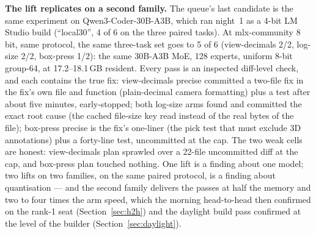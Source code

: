 \textbf{The lift replicates on a second family.} The queue's last candidate is the same experiment on
Qwen3-Coder-30B-A3B, which ran night~1 as a 4-bit LM Studio build (``local30'', 4 of 6 on the three paired
tasks). At mlx-community 8 bit, same protocol, the same three-task set goes to 5 of 6 (view-decimals 2/2,
log-size 2/2, box-press 1/2): the same 30B-A3B MoE, 128 experts, uniform 8-bit group-64, at 17.2--18.1\,GB
resident. Every pass is an inspected diff-level check, and each contains the true fix: view-decimals precise
committed a two-file fix in the fix's own file and function (plain-decimal camera formatting) plus a test after
about five minutes, early-stopped; both log-size arms found and committed the exact root cause (the cached
file-size key read instead of the real bytes of the file); box-press precise is the fix's one-liner (the pick
test that must exclude 3D annotations) plus a forty-line test, uncommitted at the cap. The two weak cells are
honest: view-decimals plan sprawled over a 22-file uncommitted diff at the cap, and box-press plan touched
nothing. One lift is a finding about one model; two lifts on two families, on the same paired protocol, is a
finding about quantisation --- and the second family delivers the passes at half the memory and two to four
times the arm speed, which the morning head-to-head then confirmed on the rank-1 seat
(Section~\ref{sec:h2h}) and the daylight build pass confirmed at the level of the builder
(Section~\ref{sec:daylight}).

\begin{table}[htbp]
\centering
\small
\caption{The 4\,bit $\rightarrow$ 8\,bit lift across three families on the same paired three-task protocol
(view-decimals, log-size, box-press; buildless grade-diff grading with every diff inspected). Families 1 and 2
are the A/B above and the paragraph above; family 3 is the round-11 run of 12:14--12:44 with its two-rep
completion of rounds 12--14 (Table~\ref{tab:logrep}).}\label{tab:families}
\end{table}

